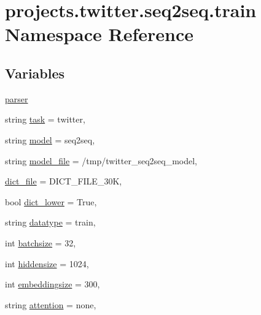 \hypertarget{namespaceprojects_1_1twitter_1_1seq2seq_1_1train}{}\section{projects.\+twitter.\+seq2seq.\+train Namespace Reference}
\label{namespaceprojects_1_1twitter_1_1seq2seq_1_1train}
\subsection*{Variables}
\begin{DoxyCompactItemize}
\item 
\hyperlink{namespaceprojects_1_1twitter_1_1seq2seq_1_1train_a9e6a15f047bea69a82a938079cc0ba2f}{parser}
\item 
string \hyperlink{namespaceprojects_1_1twitter_1_1seq2seq_1_1train_a55eb6b602f4eee4a94f0093d9d2154ce}{task} = \textquotesingle{}twitter\textquotesingle{},
\item 
string \hyperlink{namespaceprojects_1_1twitter_1_1seq2seq_1_1train_a8905c3560c1529416f39af63abc51502}{model} = \textquotesingle{}seq2seq\textquotesingle{},
\item 
string \hyperlink{namespaceprojects_1_1twitter_1_1seq2seq_1_1train_a4a0edd80e7e6185d86cdd18d530bc5dc}{model\+\_\+file} = \textquotesingle{}/tmp/twitter\+\_\+seq2seq\+\_\+model\textquotesingle{},
\item 
\hyperlink{namespaceprojects_1_1twitter_1_1seq2seq_1_1train_ab00b37ad91423948f2d9bf2839b64316}{dict\+\_\+file} = D\+I\+C\+T\+\_\+\+F\+I\+L\+E\+\_\+30K,
\item 
bool \hyperlink{namespaceprojects_1_1twitter_1_1seq2seq_1_1train_abd3f688610da73a24197e3e757027162}{dict\+\_\+lower} = True,
\item 
string \hyperlink{namespaceprojects_1_1twitter_1_1seq2seq_1_1train_ab403e49793bf1216011c2dbb3a27623c}{datatype} = \textquotesingle{}train\textquotesingle{},
\item 
int \hyperlink{namespaceprojects_1_1twitter_1_1seq2seq_1_1train_a58b22824e7d41d87fc73af8dfb328749}{batchsize} = 32,
\item 
int \hyperlink{namespaceprojects_1_1twitter_1_1seq2seq_1_1train_aa534f9e55bd140ffad3e9c1ae575c457}{hiddensize} = 1024,
\item 
int \hyperlink{namespaceprojects_1_1twitter_1_1seq2seq_1_1train_a82222d25ff481b28b5f4075ebc489dd7}{embeddingsize} = 300,
\item 
string \hyperlink{namespaceprojects_1_1twitter_1_1seq2seq_1_1train_a75fbf83d263214701993abcbec8ede18}{attention} = \textquotesingle{}none\textquotesingle{},

\end{DoxyCompactItemize}

